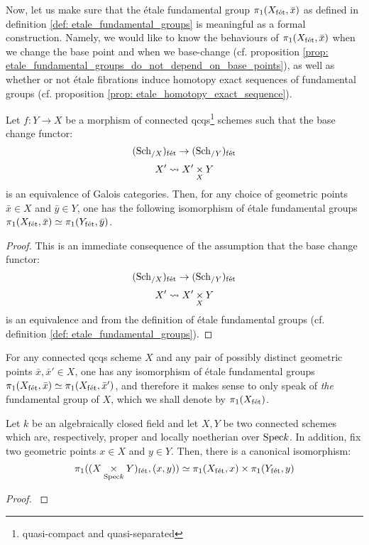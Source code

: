         Now, let us make sure that the \'etale fundamental group $\pi_1(X_{\mathrm{f\acute{e}t}}, \bar{x})$ as defined in definition \ref{def: etale_fundamental_groups} is meaningful as a formal construction. Namely, we would like to know the behaviours of $\pi_1(X_{\mathrm{f\acute{e}t}}, \bar{x})$ when we change the base point and when we base-change (cf. proposition \ref{prop: etale_fundamental_groups_do_not_depend_on_base_points}), as well as whether or not \'etale fibrations induce homotopy exact sequences of fundamental groups (cf. proposition \ref{prop: etale_homotopy_exact_sequence}). 
        \begin{proposition} \label{prop: etale_fundamental_groups_do_not_depend_on_base_points}
            Let $f: Y \to X$ be a morphism of connected qcqs\footnote{quasi-compact and quasi-separated} schemes such that the base change functor:
                $$(\mathrm{Sch}_{/X})_{\mathrm{f\acute{e}t}} \to (\mathrm{Sch}_{/Y})_{\mathrm{f\acute{e}t}}$$
                $$X' \mapsto X' \x_X Y$$
            is an equivalence of Galois categories. Then, for any choice of geometric points $\bar{x} \in X$ and $\bar{y} \in Y$, one has the following isomorphism of \'etale fundamental groups $\pi_1(X_{\mathrm{f\acute{e}t}}, \bar{x}) \simeq \pi_1(Y_{\mathrm{f\acute{e}t}}, \bar{y})$.
        \end{proposition}
            \begin{proof}
                This is an immediate consequence of the assumption that the base change functor:
                    $$(\mathrm{Sch}_{/X})_{\mathrm{f\acute{e}t}} \to (\mathrm{Sch}_{/Y})_{\mathrm{f\acute{e}t}}$$
                    $$X' \mapsto X' \x_X Y$$
                is an equivalence and from the definition of \'etale fundamental groups (cf. definition \ref{def: etale_fundamental_groups}).
            \end{proof}
        \begin{corollary} \label{coro: etale_fundamental_group_uniqueness}
            For any connected qcqs scheme $X$ and any pair of possibly distinct geometric points $\bar{x}, \bar{x}' \in X$, one has any isomorphism of \'etale fundamental groups $\pi_1(X_{\mathrm{f\acute{e}t}}, \bar{x}) \simeq \pi_1(X_{\mathrm{f\acute{e}t}}, \bar{x}')$, and therefore it makes sense to only speak of \textit{the} fundamental group of $X$, which we shall denote by $\pi_1(X_{\mathrm{f\acute{e}t}})$.
        \end{corollary}
        
        \begin{proposition}
            Let $k$ be an algebraically closed field and let $X, Y$ be two connected schemes which are, respectively, proper and locally noetherian over $\mathrm{Spec} k$. In addition, fix two geometric points $x \in X$ and $y \in Y$. Then, there is a canonical isomorphism:
                $$\pi_1((X \x_{\Spec k} Y)_{\fet}, (x, y)) \cong \pi_1(X_{\fet}, x) \x \pi_1(Y_{\fet}, y)$$
        \end{proposition}
            \begin{proof}
                \cite[Corollaire 1.7]{SGA1}
            \end{proof}
        
